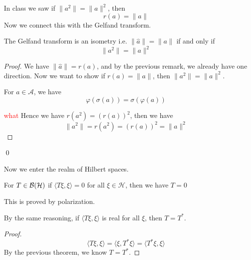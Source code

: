 In class we saw if $\|a^2\|=\|a\|^2$, then 
\begin{equation*}
    r(a)=\|a\|
\end{equation*}
Now we connect this with the Gelfand transform.
\begin{proposition}
    The Gelfand transform is an isometry i.e. $\|\widehat{a}\|=\|a\|$ if and only if 
    \begin{equation*}
        \|a^2\|=\|a\|^2
    \end{equation*}
\end{proposition}
\begin{proof}
    We have $\|\widehat{a}\|=r(a)$, and by the previous remark, we already have one direction. Now we want to show if $r(a)=\|a\|$, then $\|a^2\|=\|a\|^2$.
    \begin{lemma}
        For $a\in\mathcal{A}$, we have
        \begin{equation*}
            \varphi(\sigma(a))=\sigma(\varphi(a))
        \end{equation*}
    \end{lemma}
    \textcolor{red}{what}
    Hence we have $r(a^2)=(r(a))^2$, then we have
    \begin{equation*}
        \|a^2\|=r(a^2)=(r(a))^2=\|a\|^2
    \end{equation*}
\end{proof}
\qed

Now we enter the realm of Hilbert spaces.

\begin{theorem}
    For $T\in\mathcal{B}(\mathcal{H})$ if $\langle T\xi, \xi\rangle=0$ for all $\xi\in\mathcal{H}$, then we have $T=0$
\end{theorem}
\begin{remark}
    This is proved by polarization.
\end{remark}

\begin{proposition}
    By the same reasoning, if $\langle T\xi, \xi\rangle$ is real for all $\xi$, then $T=T^*$.
\end{proposition}
\begin{proof}
    \begin{equation*}
        \langle T\xi, \xi\rangle =\langle \xi, T^*\xi\rangle=\langle T^*\xi, \xi\rangle
    \end{equation*}
    By the previous theorem, we know $T=T^*$.
\end{proof}

